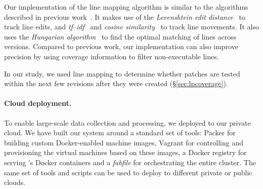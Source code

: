 Our implementation of the line mapping algorithm is similar to the
algorithms described in previous
work~\cite{szz:msr05,szz:ase06,change-source-code:msr07,szzrevisited:defects08}.
It makes use of the \emph{Levenshtein edit
  distance}~\cite{levenshtein1966binary} to track line edits, and
\emph{tf--idf}~\cite{tf-idf} and \emph{cosine
  similarity}~\cite{cosinesimilarity} to track line movements.  It
also uses the \emph{Hungarian algorithm}~\cite{hungarian} to find the
optimal matching of lines across versions.  Compared to previous work,
our implementation can also improve precision by using coverage information to filter
non-executable lines.


In our study, we used line mapping to determine whether patches are
tested within the next few revisions after they were created
(\S\ref{sec:lpcoverage}).

\paragraph{Cloud deployment.} To enable large-scale data collection and
processing, we deployed \covrig to our private cloud.  We have built our
system around a standard set of tools: Packer for building custom
Docker-enabled machine images, Vagrant for controlling and provisioning
the virtual machines based on these images, a Docker registry for
serving \covrig's Docker containers and a {\em fabfile} for
orchestrating the entire cluster. The same set of tools and scripts
can be used to deploy \covrig to different private or public clouds.




